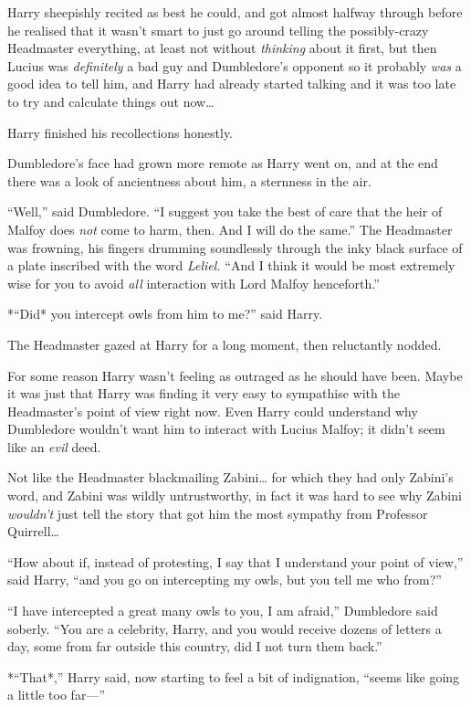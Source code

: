 Harry sheepishly recited as best he could, and got almost halfway
through before he realised that it wasn't smart to just go around
telling the possibly-crazy Headmaster everything, at least not without
\emph{thinking} about it first, but then Lucius was \emph{definitely} a
bad guy and Dumbledore's opponent so it probably \emph{was} a good idea
to tell him, and Harry had already started talking and it was too late
to try and calculate things out now\ldots{}

Harry finished his recollections honestly.

Dumbledore's face had grown more remote as Harry went on, and at the end
there was a look of ancientness about him, a sternness in the air.

``Well,'' said Dumbledore. ``I suggest you take the best of care that
the heir of Malfoy does \emph{not} come to harm, then. And I will do the
same.'' The Headmaster was frowning, his fingers drumming soundlessly
through the inky black surface of a plate inscribed with the word
\emph{Leliel.} ``And I think it would be most extremely wise for you to
avoid \emph{all} interaction with Lord Malfoy henceforth.''

*``Did* you intercept owls from him to me?'' said Harry.

The Headmaster gazed at Harry for a long moment, then reluctantly
nodded.

For some reason Harry wasn't feeling as outraged as he should have been.
Maybe it was just that Harry was finding it very easy to sympathise with
the Headmaster's point of view right now. Even Harry could understand
why Dumbledore wouldn't want him to interact with Lucius Malfoy; it
didn't seem like an \emph{evil} deed.

Not like the Headmaster blackmailing Zabini\ldots{} for which they had
only Zabini's word, and Zabini was wildly untrustworthy, in fact it was
hard to see why Zabini \emph{wouldn't} just tell the story that got him
the most sympathy from Professor Quirrell\ldots{}

``How about if, instead of protesting, I say that I understand your
point of view,'' said Harry, ``and you go on intercepting my owls, but
you tell me who from?''

``I have intercepted a great many owls to you, I am afraid,'' Dumbledore
said soberly. ``You are a celebrity, Harry, and you would receive dozens
of letters a day, some from far outside this country, did I not turn
them back.''

*``That*,'' Harry said, now starting to feel a bit of indignation,
``seems like going a little too far---''

